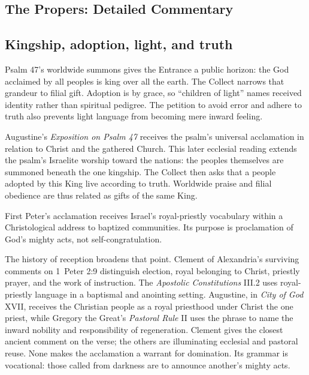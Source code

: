 \begin{deepstudy}
\clearpage
\section*{The Propers: Detailed Commentary}

\subsection*{Kingship, adoption, light, and truth\enspace{}}

Psalm 47's worldwide summons gives the Entrance a public horizon: the God acclaimed by all peoples is king over all the earth. The Collect narrows that grandeur to filial gift. Adoption is by grace, so “children of light” names received identity rather than spiritual pedigree. The petition to avoid error and adhere to truth also prevents light language from becoming mere inward feeling.

Augustine's \emph{Exposition on Psalm 47} receives the psalm's universal acclamation in relation to Christ and the gathered Church. This later ecclesial reading extends the psalm's Israelite worship toward the nations: the peoples themselves are summoned beneath the one kingship. The Collect then asks that a people adopted by this King live according to truth. Worldwide praise and filial obedience are thus related as gifts of the same King.

First Peter's acclamation receives Israel's royal-priestly vocabulary within a Christological address to baptized communities. Its purpose is proclamation of God's mighty acts, not self-congratulation.

The history of reception broadens that point. Clement of Alexandria's surviving comments on 1~Peter 2:9 distinguish election, royal belonging to Christ, priestly prayer, and the work of instruction. The \emph{Apostolic Constitutions} III.2 uses royal-priestly language in a baptismal and anointing setting. Augustine, in \emph{City of God} XVII, receives the Christian people as a royal priesthood under Christ the one priest, while Gregory the Great's \emph{Pastoral Rule} II uses the phrase to name the inward nobility and responsibility of regeneration. Clement gives the closest ancient comment on the verse; the others are illuminating ecclesial and pastoral reuse. None makes the acclamation a warrant for domination. Its grammar is vocational: those called from darkness are to announce another's mighty acts.


\end{deepstudy}
